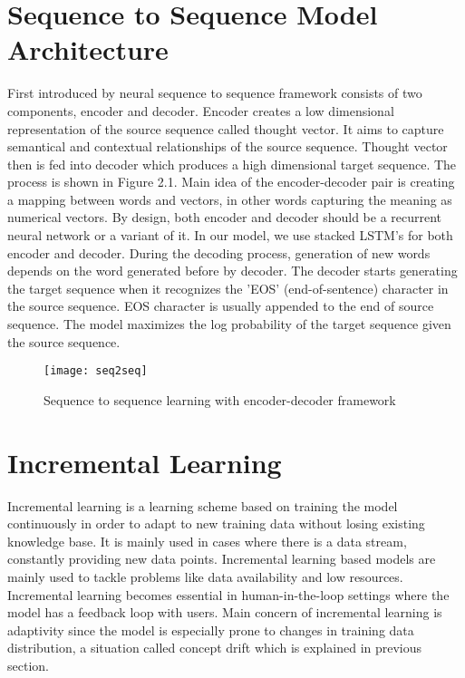 \section{Sequence to Sequence Model Architecture}

First introduced by \cite{Vinyalsetal} neural sequence to sequence framework consists of two components, encoder and decoder. Encoder creates a low dimensional representation of the source sequence called thought vector. It aims to capture semantical and contextual relationships of the source sequence. Thought vector then is fed into decoder which produces a high dimensional target sequence. The process is shown in Figure 2.1. Main idea of the encoder-decoder pair is creating a mapping between words and vectors, in other words capturing the meaning as numerical vectors. By design, both encoder and decoder should be a recurrent neural network or a variant of it. In our model, we use stacked LSTM's for both encoder and decoder. During the decoding process, generation of new words depends on the word generated before by decoder. The decoder starts generating the target sequence when it recognizes the 'EOS' (end-of-sentence) character in the source sequence. EOS character is usually appended to the end of source sequence. The model maximizes the log probability of the target sequence given the source sequence.

\begin{figure}[t]
\texttt{[image: seq2seq]}
\centering
\caption{Sequence to sequence learning with encoder-decoder framework}
\end{figure}

\section{Incremental Learning}

Incremental learning is a learning scheme based on training the model continuously in order to adapt to new training data without losing existing knowledge base. It is mainly used in cases where there is a data stream, constantly providing new data points. Incremental learning based models are mainly used to tackle problems like data availability and low resources. Incremental learning becomes essential in human-in-the-loop settings where the model has a feedback loop with users. Main concern of incremental learning is adaptivity since the model is especially prone to changes in training data distribution, a situation called concept drift which is explained in previous section. 


